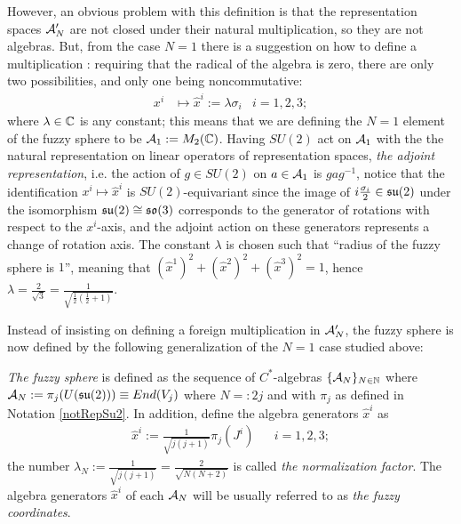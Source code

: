 However, an obvious problem with this definition is that the representation spaces $\mathcal A_N'$ are not closed under their natural multiplication, so they are not algebras. But, from the case $N = 1$ there is a suggestion on how to define a multiplication \cite{Madore}: requiring that the radical of the algebra is zero, there are only two possibilities, and only one being noncommutative:
\begin{align}
    x^i &\mapsto \hat x^i := \lambda \sigma_i & i = 1, 2, 3;
\end{align}
where $\lambda\in \mathbb{C}$ is any constant; this means that we are defining the $N = 1$ element of the fuzzy sphere to be $\textcolor{black}{\mathcal A_1} := M_2(\mathbb{C})$. Having $SU(2)$ act on $\mathcal A_1$ with the the natural representation on linear operators of representation spaces, \emph{the adjoint representation}, i.e. the action of $g \in SU(2)$ on $a \in \mathcal A_1$ is $gag^{-1}$, notice that the identification $x^i \mapsto \hat x^i$ is $SU(2)$-equivariant since the image of $i\frac{\sigma_i}{2} \in \mathfrak{su}(2)$ under the isomorphism $\mathfrak{su}(2) \cong \mathfrak{so}(3)$ corresponds to the generator of rotations with respect to the $x^i$-axis, and the adjoint action on these generators represents a change of rotation axis. The constant $\lambda$ is chosen such that ``radius of the fuzzy sphere is $1$'', meaning that $(\hat x^1)^2 + (\hat x^2)^2 + (\hat  x^3)^2 = 1$, hence $\lambda = \frac{2}{\sqrt{3}} = \frac{1}{\sqrt{\frac{1}{2} (\frac{1}{2} + 1)}}$.

Instead of insisting on defining a foreign multiplication in $\mathcal A'_N$, the fuzzy sphere is now defined by the following generalization of the $N = 1$ case studied above:
\begin{definition}\label{definitionFuzzySphere}
\emph{The fuzzy sphere} is defined as the sequence of $C^*$-algebras $\{\mathcal A_N\}_{N \in \mathbb{N}}$ where $\mathcal A_N := \pi_j(U(\mathfrak{su}(2))) \equiv End(V_j)$ where $N =: 2j$ and with $\pi_j$ as defined in Notation \ref{notRepSu2}. In addition, define the algebra generators $\hat x^i$ as
\begin{align}\label{equationDefinitionGeneratorsFuzzySphere}
    \hat x^i := \frac{1}{\sqrt{j(j+1)}} \pi_{j}(J^i) && i = 1, 2, 3;
\end{align}
the number $\lambda_N := \frac{1}{\sqrt{j(j+1)}} = \frac{2}{\sqrt{N(N+2)}}$ is called \emph{the normalization factor}. The algebra generators $\hat x^i$ of each $\mathcal A_N$ will be usually referred to as \emph{the fuzzy coordinates}.
\end{definition}

